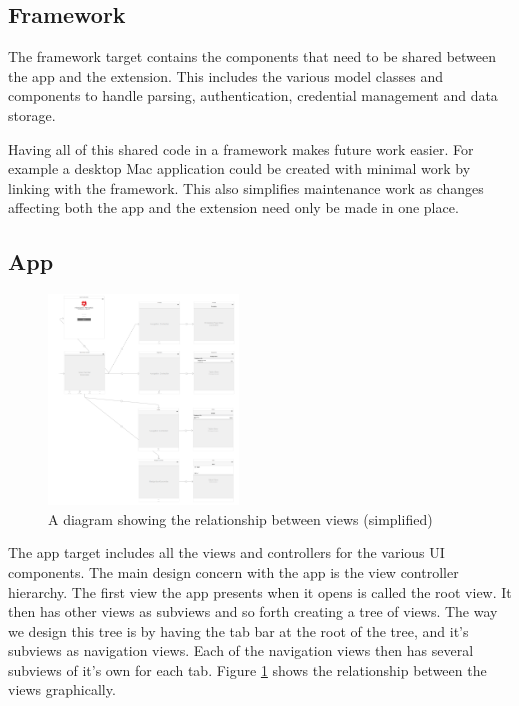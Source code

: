 \documentclass[pdftex, DIV=calc, paper=a4, fontsize=11pt]{scrartcl}	 %
\begin{document}
\subsection{Framework}
The framework target contains the components that need to be shared between the app and the extension.
This includes the various model classes and components to handle parsing, authentication, credential
management and data storage.

Having all of this shared code in a framework makes future work easier. For example a desktop Mac
application could be created with minimal work by linking with the framework. This also simplifies
maintenance work as changes affecting both the app and the extension need only be made in one place.

\subsection{App}

\begin{figure}
    \centering
    \includegraphics[width=0.45\textwidth]{view-tree.png}
    \caption{A diagram showing the relationship between views (simplified)}
    \label{fig:hierarchy}
\end{figure}

The app target includes all the views and controllers for the various UI components. 
The main design concern with the app is the view controller hierarchy. The first view the app 
presents when it opens is called the root view. It then has other views as subviews and so forth
creating a tree of views. The way we design this tree is by having the tab bar at the root of the
tree, and it's subviews as navigation views. Each of the navigation views then has several subviews
of it's own for each tab. Figure \ref{fig:hierarchy} shows the relationship between the views
graphically.
\end{document}

